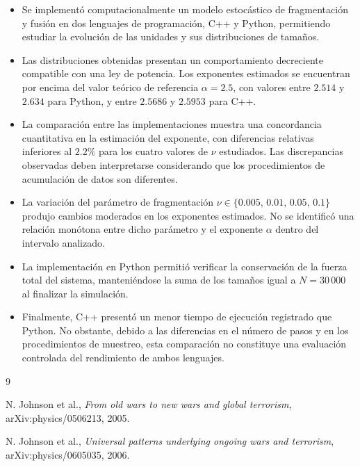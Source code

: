 \documentclass[
a4paper,
amsfonts,
amssymb,
amsmath,
reprint,
twoside
]{revtex4-1}
\begin{document}
\begin{itemize}

    \item Se implementó computacionalmente un modelo estocástico
    de fragmentación y fusión en dos lenguajes de programación,
    C++ y Python, permitiendo estudiar la evolución de las
    unidades y sus distribuciones de tamaños.

    \item Las distribuciones obtenidas presentan un comportamiento
    decreciente compatible con una ley de potencia. Los exponentes
    estimados se encuentran por encima del valor teórico de
    referencia $\alpha=2.5$, con valores entre $2.514$ y $2.634$
    para Python, y entre $2.5686$ y $2.5953$ para C++.

    \item La comparación entre las implementaciones muestra una
    concordancia cuantitativa en la estimación del exponente,
    con diferencias relativas inferiores al $2.2\%$ para los
    cuatro valores de $\nu$ estudiados. Las discrepancias
    observadas deben interpretarse considerando que los
    procedimientos de acumulación de datos son diferentes.

    \item La variación del parámetro de fragmentación
    $\nu\in\{0.005,\,0.01,\,0.05,\,0.1\}$ produjo cambios
    moderados en los exponentes estimados. No se identificó
    una relación monótona entre dicho parámetro y el exponente
    $\alpha$ dentro del intervalo analizado.

    \item La implementación en Python permitió verificar la
    conservación de la fuerza total del sistema, manteniéndose
    la suma de los tamaños igual a $N=30\,000$ al finalizar
    la simulación.

    \item Finalmente, C++ presentó un menor tiempo de ejecución
    registrado que Python. No obstante, debido a las diferencias
    en el número de pasos y en los procedimientos de muestreo,
    esta comparación no constituye una evaluación controlada
    del rendimiento de ambos lenguajes.

\end{itemize}

\begin{thebibliography}{9}

N. Johnson et al.,
\textit{From old wars to new wars and global terrorism},
arXiv:physics/0506213, 2005.

N. Johnson et al.,
\textit{Universal patterns underlying ongoing wars and terrorism},
arXiv:physics/0605035, 2006.

\end{thebibliography}
\end{document}
